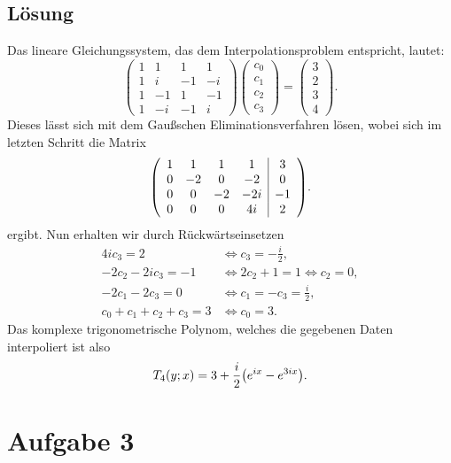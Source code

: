 \documentclass{exercise}
\begin{document}
    \subsection*{Lösung}
    Das lineare Gleichungssystem, das dem Interpolationsproblem entspricht, lautet:
    \[
        \begin{pmatrix}
            1 & 1 & 1 & 1\\
            1 & i & -1 & -i\\
            1 & -1 & 1 & -1\\
            1 & -i & -1 & i
        \end{pmatrix}\begin{pmatrix}
            c_0\\c_1\\c_2\\c_3
        \end{pmatrix} = \begin{pmatrix}
            3\\2\\3\\4
        \end{pmatrix}.
    \]
    Dieses lässt sich mit dem Gaußschen Eliminationsverfahren lösen, wobei sich im letzten Schritt die Matrix
    \[
        \parentheses*{\begin{array}{cccc|c}
            1 & 1 & 1 & 1 & 3\\
            0 & -2 & 0 & -2 & 0\\
            0 & 0 & -2 & -2i & -1\\
            0 & 0 & 0 & 4i & 2
        \end{array}}.
    \]
    ergibt.
    Nun erhalten wir durch Rückwärtseinsetzen
    \begin{align*}
        4ic_3 = 2 &\iff c_3 = -\frac{i}{2},\\
        -2c_2 - 2ic_3 = -1 &\iff 2c_2 + 1 = 1 \iff c_2 = 0,\\
        -2c_1 - 2c_3 = 0 &\iff c_1 = -c_3 = \frac{i}{2},\\
        c_0 + c_1 + c_2 + c_3 = 3 &\iff c_0 = 3.
    \end{align*}
    Das komplexe trigonometrische Polynom, welches die gegebenen Daten interpoliert ist also
    \[
        T_4\parentheses*{y; x} = 3 + \frac{i}{2}\parentheses*{e^{ix} - e^{3ix}}. 
    \]


    \section*{Aufgabe 3}
\end{document}
